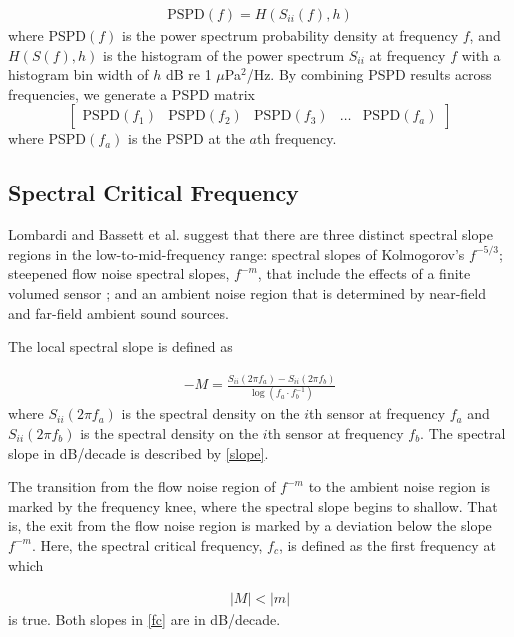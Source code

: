 \documentclass[12pt,journal,onecolumn]{IEEEtran}
\begin{document}
\begin{align}
\text{PSPD}(f) = H(S_{ii}(f),h)
\label{PSPD_definition}
\end{align}
where PSPD$(f)$ is the power spectrum probability density at frequency $f$, and $H(S(f),h)$ is the histogram of the power spectrum $S_{ii}$ at frequency $f$ with a histogram bin width of $h$  dB re 1 $\mu$Pa$^2$/Hz. By combining PSPD results across frequencies, we generate a PSPD matrix 
\begin{equation}
\begin{bmatrix}
\text{PSPD}(f_1) & \text{PSPD}(f_2) & \text{PSPD}(f_3) & \dots &\text{PSPD}(f_a)
\end{bmatrix}
\label{PSPD_matrix}
\end{equation}
where PSPD$(f_a)$ is the PSPD at the $a$th frequency. 



\subsection{Spectral Critical Frequency}
Lombardi \cite{lombardi} and Bassett et al. \cite{bassett} suggest that there are three distinct spectral slope regions in the low-to-mid-frequency range: spectral slopes of Kolmogorov's $f^{-5/3}$; steepened flow noise spectral slopes, $f^{-m}$, that include the effects of a finite volumed sensor \cite{bassett}; and an ambient noise region that is determined by near-field and far-field ambient sound sources.

The local spectral slope is defined as

\begin{align}
-M = \frac{S_{ii}(2\pi f_a) - S_{ii}(2\pi f_b)}{\log(f_a \cdot f_b^{-1})}
\label{slope}
\end{align}
where $S_{ii}(2\pi f_a)$ is the spectral density on the $i$th sensor at frequency $f_a$ and $S_{ii}(2\pi f_b)$ is the spectral density on the $i$th sensor at frequency $f_b$. The spectral slope in dB/decade is described by \eqref{slope}. 

The transition from the flow noise region of $f^{-m}$ to the ambient noise region is marked by the frequency knee, where the spectral slope begins to shallow. That is, the exit from the flow noise region is marked by a deviation below the slope $f^{-m}$. Here, the spectral critical frequency, $f_c$, is defined as the first frequency at which 

\begin{align}
|M| < |m|
\label{fc}
\end{align}
is true. Both slopes in \eqref{fc} are in dB/decade.
\end{document}
